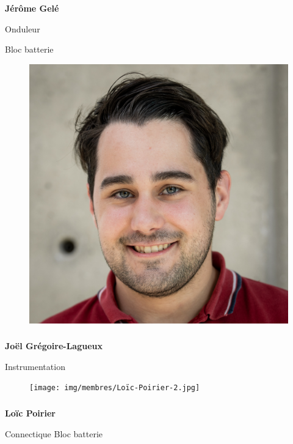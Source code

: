 \documentclass[a0paper,portrait]{baposter}
\begin{document}
\begin{poster}
{\subsubsection*{}
\textbf{Jérôme Gelé}

Onduleur

Bloc batterie

\begin{figure}
\includegraphics[width=.9\linewidth]{img/membres/Joël-Grégoire-Lagueux-1.jpg} 
\end{figure}
\subsubsection*{}
\vspace{2mm}
\textbf{Joël Grégoire-Lagueux}

Instrumentation

\begin{figure}
\texttt{[image: img/membres/Loïc-Poirier-2.jpg]} 
\end{figure}
\subsubsection*{}
\textbf{Loïc Poirier}

Connectique
Bloc batterie


}
\end{poster}
\end{document}
